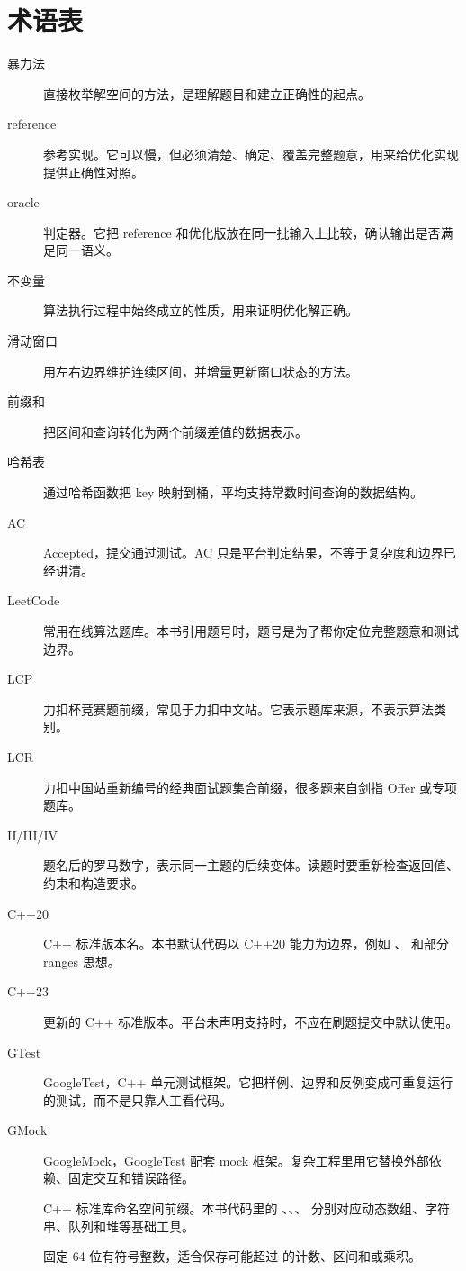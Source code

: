 \chapter*{术语表}

\begin{description}
\item[暴力法] 直接枚举解空间的方法，是理解题目和建立正确性的起点。
\item[reference] 参考实现。它可以慢，但必须清楚、确定、覆盖完整题意，用来给优化实现提供正确性对照。
\item[oracle] 判定器。它把 reference 和优化版放在同一批输入上比较，确认输出是否满足同一语义。
\item[不变量] 算法执行过程中始终成立的性质，用来证明优化解正确。
\item[滑动窗口] 用左右边界维护连续区间，并增量更新窗口状态的方法。
\item[前缀和] 把区间和查询转化为两个前缀差值的数据表示。
\item[哈希表] 通过哈希函数把 key 映射到桶，平均支持常数时间查询的数据结构。
\item[AC] Accepted，提交通过测试。AC 只是平台判定结果，不等于复杂度和边界已经讲清。
\item[LeetCode] 常用在线算法题库。本书引用题号时，题号是为了帮你定位完整题意和测试边界。
\item[LCP] 力扣杯竞赛题前缀，常见于力扣中文站。它表示题库来源，不表示算法类别。
\item[LCR] 力扣中国站重新编号的经典面试题集合前缀，很多题来自剑指 Offer 或专项题库。
\item[II/III/IV] 题名后的罗马数字，表示同一主题的后续变体。读题时要重新检查返回值、约束和构造要求。
\item[C++20] C++ 标准版本名。本书默认代码以 C++20 能力为边界，例如 、 和部分 ranges 思想。
\item[C++23] 更新的 C++ 标准版本。平台未声明支持时，不应在刷题提交中默认使用。
\item[GTest] GoogleTest，C++ 单元测试框架。它把样例、边界和反例变成可重复运行的测试，而不是只靠人工看代码。
\item[GMock] GoogleMock，GoogleTest 配套 mock 框架。复杂工程里用它替换外部依赖、固定交互和错误路径。
\item[] C++ 标准库命名空间前缀。本书代码里的 、、、 分别对应动态数组、字符串、队列和堆等基础工具。
\item[] 固定 64 位有符号整数，适合保存可能超过  的计数、区间和或乘积。

\end{description}
